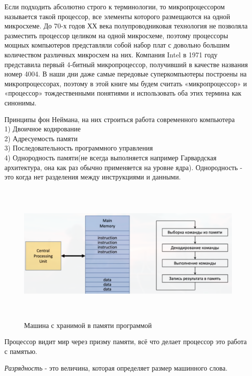 	\par Если подходить абсолютно строго к терминологии, то микропроцессором называется такой процессор, все элементы которого размещаются на одной микросхеме. До 70-х годов ХХ века полупроводниковая технология не позволяла разместить процессор целиком на одной микросхеме, поэтому процессоры мощных компьютеров представляли собой набор плат с довольно большим количеством различных микросхем на них. Компания Intel в 1971 году представила первый 4-битный микропроцессор, получивший в качестве названия номер 4004. В наши дни даже самые передовые суперкомпьютеры построены на микропроцессорах, поэтому в этой книге мы будем считать «микропроцессор» и «процессор» тождественными понятиями и использовать оба этих  термина как синонимы.
	
	\par Принципы фон Неймана, на них строиться работа современного компьютера
	\\1) Двоичное кодирование
	\\2) Адресуемость памяти 
	\\3) Последовательность программного управления
	\\4) Однородность памяти(не всегда выполняется например Гарвардская архитектура, она как раз обычно применяется на уровне ядра). Однородность - это когда нет разделения между инструкциями и данными.
	
	\begin{figure}[h]
		\centering
		\includegraphics[height=7cm]{img/3.5} 
		\captionsetup{font=footnotesize} 
		\caption*{Машина с хранимой в памяти программой} 
	\end{figure}
	
	\par Процессор видит мир через призму памяти, всё что делает процессор это работа с памятью.
	\par \textit{Разрядность} - это величина, которая определяет размер машинного слова.
	
